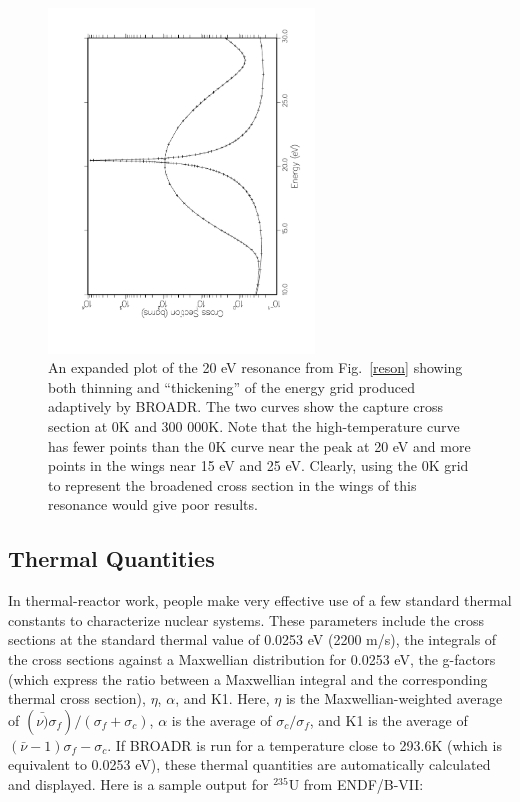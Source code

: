 \begin{figure}[t]\centering
\includegraphics[keepaspectratio, height=3.6in, angle=270]{figs/broadr4ack}
\caption[Energy grid variation with Doppler broadening]{An expanded plot
 of the 20 eV resonance  from Fig.~\ref{reson} showing both thinning
 and ``thickening'' of the energy grid produced adaptively
 by BROADR.  The two curves show the capture cross section
 at 0K and 300 000K.  Note that the high-temperature
 curve has fewer points than the 0K curve near the peak
 at 20 eV and more  points in the wings near 15 eV and 25
 eV.  Clearly, using the 0K grid to represent the
 broadened cross section in the wings of this resonance
 would give poor results.}
   \label{grids}
\end{figure}

\subsection{Thermal Quantities}
\label{ssBROADR_thermal}

In thermal-reactor work, people make very effective use of a few
standard thermal constants to
characterize nuclear systems.  These parameters include
the cross sections at the standard thermal value of
0.0253 eV (2200 m/s), the integrals of the cross sections
against a Maxwellian distribution for 0.0253 eV, the g-factors
(which express the ratio between a Maxwellian integral and the
corresponding thermal cross section), $\eta$, $\alpha$, and K1.
Here, $\eta$ is the Maxwellian-weighted average of
$(\bar{\nu)}\sigma_f)/(\sigma_f+\sigma_c)$, $\alpha$ is
the average of $\sigma_c/\sigma_f$, and K1 is the average
of $(\bar{\nu}-1)\sigma_f-\sigma_c$.  If BROADR is run for a
temperature close to 293.6K (which is equivalent to 0.0253 eV),
these thermal quantities are automatically calculated and displayed.
Here is a sample output for $^{235}$U from ENDF/B-VII:

